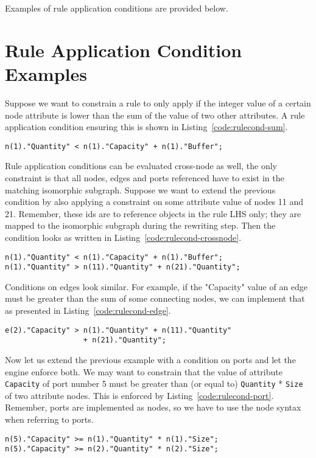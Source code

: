 \documentclass[a4paper,10pt,runningheads]{llncs}
\begin{document}
Examples of rule application conditions are provided below.

\section{Rule Application Condition Examples}
Suppose we want to constrain a rule to only apply if the integer value of a certain node attribute is lower than the sum of the value of two other attributes.
A rule application condition ensuring this is shown in Listing~\ref{code:rulecond-sum}.
\begin{lstlisting}[caption={Rule application condition example, sum of attributes}, label={code:rulecond-sum}, style=rulecondstyle]
n(1)."Quantity" < n(1)."Capacity" + n(1)."Buffer";
\end{lstlisting}

Rule application conditions can be evaluated cross-node as well, the only constraint is that all nodes,
edges and ports referenced have to exist in the matching isomorphic subgraph.
Suppose we want to extend the previous condition by also applying a constraint on some attribute value of nodes 11 and 21.
Remember, these ids are to reference objects in the rule LHS only; they are mapped to the isomorphic subgraph during the rewriting step.
Then the condition looks as written in Listing~\ref{code:rulecond-crossnode}.
\begin{lstlisting}[caption={Rule application condition example, cross-node}, label={code:rulecond-crossnode}, style=rulecondstyle]
n(1)."Quantity" < n(1)."Capacity" + n(1)."Buffer";
n(1)."Quantity" > n(11)."Quantity" + n(21)."Quantity";
\end{lstlisting}

Conditions on edges look similar. For example, if the "Capacity" value of an edge must be greater than the sum of some connecting nodes,
we can implement that as presented in Listing~\ref{code:rulecond-edge}.
\begin{lstlisting}[caption={Rule application condition example, edge attribute}, label={code:rulecond-edge}, style=rulecondstyle]
e(2)."Capacity" > n(1)."Quantity" + n(11)."Quantity"
                  + n(21)."Quantity";
\end{lstlisting}

Now let us extend the previous example with a condition on ports and let the engine enforce both.
We may want to constrain that the value of attribute {\tt Capacity} of port number 5
must be greater than (or equal to) {\tt Quantity} * {\tt Size} of two attribute nodes.
This is enforced by Listing~\ref{code:rulecond-port}. Remember, ports are implemented as nodes,
so we have to use the node syntax when referring to ports.
\begin{lstlisting}[caption={Rule application condition example, port attribute}, label={code:rulecond-port}, style=rulecondstyle]
n(5)."Capacity" >= n(1)."Quantity" * n(1)."Size";
n(5)."Capacity" >= n(2)."Quantity" * n(2)."Size";
\end{lstlisting}
\end{document}
